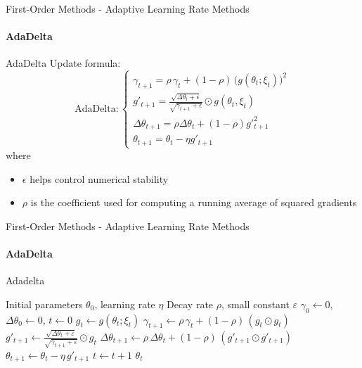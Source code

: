 \documentclass{beamer}
\begin{document}
\begin{frame}[fragile]{First-Order Methods - Adaptive Learning Rate Methods}
\framesubtitle{AdaDelta}
\begin{block}{AdaDelta}
Update formula:
\[
\text{AdaDelta}:\begin{cases}
\gamma_{t+1} = \rho\,\gamma_t + (1 - \rho)\,\big(g(\theta_t; \xi_t)\big)^2 \\
g'_{t+1}= \frac{\sqrt{\Delta \theta_t +\epsilon}} {\sqrt{\gamma_{t+1}+\epsilon}} \odot g(\theta_t, \xi_t)\\
\Delta \theta_{t+1} = \rho\Delta\theta_{t} +(1-\rho)g'^2_{t+1}\\
\theta_{t+1} = \theta_t - 
\eta g'_{t+1}
\end{cases}
\]
where
\begin{itemize}
    \item $\epsilon$ helps control numerical stability
    \item $\rho$ is the coefficient used for computing a running average of squared gradients
\end{itemize}
\end{block}
\end{frame}

\begin{frame}[fragile]{First-Order Methods - Adaptive Learning Rate Methods}
\framesubtitle{AdaDelta}
\begin{algorithm}[H]
\caption{Adadelta}
\begin{algorithmic}[1]
\Require Initial parameters $\theta_0$, learning rate $\eta$
\Require Decay rate $\rho$, small constant $\varepsilon$
\State $\gamma_0 \gets 0$, $\Delta\theta_0 \gets 0$, $t \gets 0$ 
    \State $g_t \gets g(\theta_t; \xi_t)$ 
    \State $\gamma_{t+1} \gets \rho\,\gamma_t + (1 - \rho)\, (g_t \odot g_t)$ 
    \State $g'_{t+1} \gets \frac{\sqrt{\Delta\theta_t + \varepsilon}}{\sqrt{\gamma_{t+1} + \varepsilon}} \odot g_t$ 
    \State $\Delta\theta_{t+1} \gets \rho\,\Delta\theta_t + (1 - \rho)\,(g'_{t+1} \odot g'_{t+1})$ 
    \State $\theta_{t+1} \gets \theta_t - \eta\,g'_{t+1}$ 
    \State $t \gets t + 1$ 
\EndWhile
\State \Return $\theta_t$
\end{algorithmic}
\end{algorithm}
\end{frame}
\end{document}
